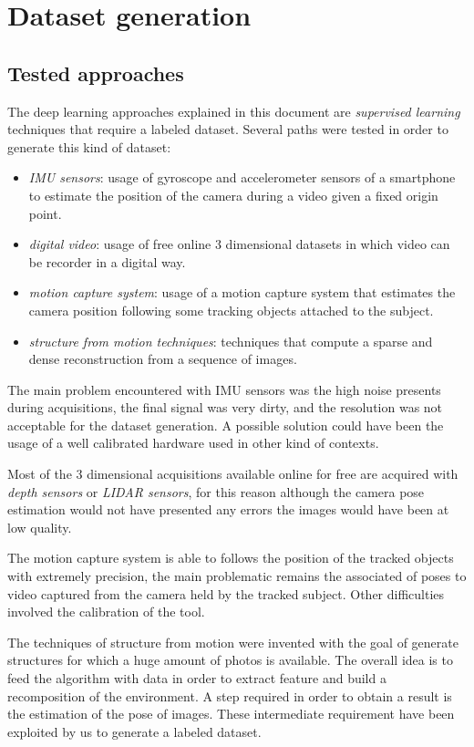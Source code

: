 \section{Dataset generation}
\subsection{Tested approaches}
The deep learning approaches explained in this document are \textit{supervised learning} techniques that require a labeled dataset. Several paths were tested in order to generate this kind of dataset:
\begin{itemize}
    \item \emph{IMU sensors}: usage of gyroscope and accelerometer sensors of a smartphone to estimate the position of the camera during a video given a fixed origin point. 
    \item \emph{digital video}: usage of free online 3 dimensional datasets in which video can be recorder in a digital way.
    \item \emph{motion capture system}: usage of a motion capture system that estimates the camera position following some tracking objects attached to the subject.
    \item \emph{structure from motion techniques}: techniques that compute a sparse and dense reconstruction from a sequence of images.
\end{itemize}

The main problem encountered with IMU sensors was the high noise presents during acquisitions, the final signal was very dirty, and the resolution was not acceptable for the dataset generation. A possible solution could have been the usage of a well calibrated hardware used in other kind of contexts.

Most of the 3 dimensional acquisitions available online for free are acquired with \emph{depth sensors} or \emph{LIDAR sensors}, for this reason although the camera pose estimation would not have presented any errors the images would have been at low quality.

The motion capture system is able to follows the position of the tracked objects with extremely precision, the main problematic remains the associated of poses to video captured from the camera held by the tracked subject. Other difficulties involved the calibration of the tool.

The techniques of structure from motion were invented with the goal of generate structures for which a huge amount of photos is available. The overall idea is to feed the algorithm with data in order to extract feature and build a recomposition of the environment. A step required in order to obtain a result is the estimation of the pose of images. These intermediate requirement have been exploited by us to generate a labeled dataset.


